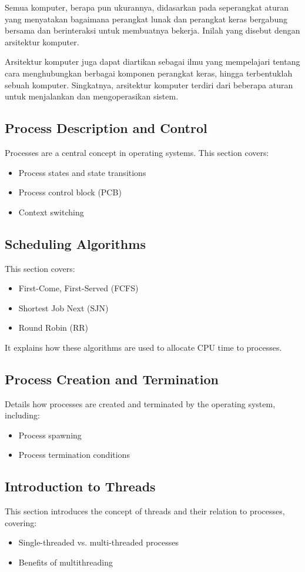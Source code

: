 \documentclass[12pt]{article}
\begin{document}
Semua komputer, berapa pun ukurannya, didasarkan pada seperangkat aturan yang menyatakan bagaimana perangkat lunak dan perangkat keras bergabung bersama dan berinteraksi untuk membuatnya bekerja. Inilah yang disebut dengan arsitektur komputer. 


Arsitektur komputer juga dapat diartikan sebagai ilmu yang mempelajari tentang cara menghubungkan berbagai komponen perangkat keras, hingga terbentuklah sebuah komputer. Singkatnya, arsitektur komputer terdiri dari beberapa aturan untuk menjalankan dan mengoperasikan sistem.

\subsection{Process Description and Control}
Processes are a central concept in operating systems. This section covers:
\begin{itemize}
    \item Process states and state transitions
    \item Process control block (PCB)
    \item Context switching
\end{itemize}

\subsection{Scheduling Algorithms}
This section covers:
\begin{itemize}
    \item First-Come, First-Served (FCFS)
    \item Shortest Job Next (SJN)
    \item Round Robin (RR)
\end{itemize}
It explains how these algorithms are used to allocate CPU time to processes.

\subsection{Process Creation and Termination}
Details how processes are created and terminated by the operating system, including:
\begin{itemize}
    \item Process spawning
    \item Process termination conditions
\end{itemize}

\subsection{Introduction to Threads}
This section introduces the concept of threads and their relation to processes, covering:
\begin{itemize}
    \item Single-threaded vs. multi-threaded processes
    \item Benefits of multithreading
\end{itemize}
\end{document}
